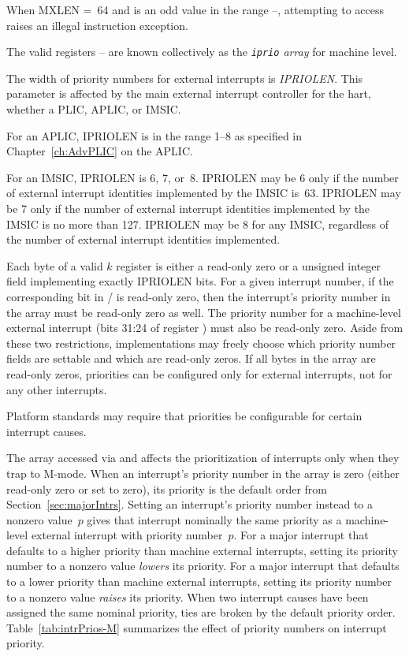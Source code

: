When MXLEN =~64 and  is an odd value in the range
--, attempting to access  raises an illegal
instruction exception.

The valid registers -- are known collectively as
the \emph{\texttt{iprio} array} for machine level.

The width of priority numbers for external interrupts is
\emph{IPRIOLEN}.
This parameter is affected by the main external interrupt controller
for the hart, whether a PLIC, APLIC, or IMSIC.

For an APLIC, IPRIOLEN is in the range 1--8 as specified in
Chapter~\ref{ch:AdvPLIC} on the APLIC.

For an IMSIC, IPRIOLEN is 6, 7, or~8.
IPRIOLEN may be 6 only if the number of external interrupt identities
implemented by the IMSIC is~63.
IPRIOLEN may be 7 only if the number of external interrupt identities
implemented by the IMSIC is no more than 127.
IPRIOLEN may be 8 for any IMSIC, regardless of the number of external
interrupt identities implemented.

Each byte of a valid $k$ register is either a read-only zero
or a {\WARL} unsigned integer field implementing exactly IPRIOLEN bits.
For a given interrupt number, if the corresponding bit in
/ is read-only zero, then the interrupt's priority
number in the  array must be read-only zero as well.
The priority number for a machine-level external interrupt (bits 31:24
of register ) must also be read-only zero.
Aside from these two restrictions, implementations may freely choose
which priority number fields are settable and which are read-only
zeros.
If all bytes in the  array are read-only zeros, priorities
can be configured only for external interrupts, not for any other
interrupts.

\begin{commentary}
Platform standards may require that priorities be configurable for
certain interrupt causes.
\end{commentary}

The  array accessed via  and  affects the
prioritization of interrupts only when they trap to \mbox{M-mode}.
When an interrupt's priority number in the array is zero (either
read-only zero or set to zero), its priority is the default order from
Section~\ref{sec:majorIntrs}.
Setting an interrupt's priority number instead to a nonzero value~$p$
gives that interrupt nominally the same priority as a machine-level
external interrupt with priority number~$p$.
For a major interrupt that defaults to a higher priority than machine
external interrupts, setting its priority number to a nonzero value
\emph{lowers} its priority.
For a major interrupt that defaults to a lower priority than machine
external interrupts, setting its priority number to a nonzero value
\emph{raises} its priority.
When two interrupt causes have been assigned the same nominal priority,
ties are broken by the default priority order.
Table~\ref{tab:intrPrios-M} summarizes the effect of priority numbers
on interrupt priority.


